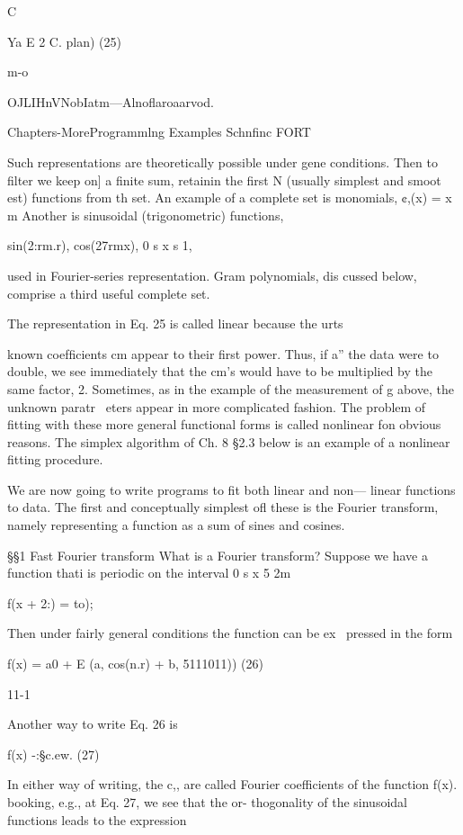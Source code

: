 {{{{{{{{C

Ya E 2 C. plan) (25)

m-o

OJLIHnVNobIatm—Alnoﬂaroaarvod.

Chapters-MoreProgrammlng Examples Schnﬁnc FORT

Such representations are theoretically possible under gene
conditions. Then to ﬁlter we keep on] a ﬁnite sum, retainin
the ﬁrst N (usually simplest and smoot est) functions from th
set. An example of a complete set is monomials, ¢,(x) = x m
Another is sinusoidal (trigonometric) functions,

sin(2:rm.r), cos(27rmx), 0 s x s 1,

used in Fourier-series representation. Gram polynomials, dis
cussed below, comprise a third useful complete set.

The representation in Eq. 25 is called linear because the urts

known coefﬁcients cm appear to their ﬁrst power. Thus, if a”
the data were to double, we see immediately that the cm's would
have to be multiplied by the same factor, 2. Sometimes, as in the
example of the measurement of g above, the unknown paratr~
eters appear in more complicated fashion. The problem of ﬁtting
with these more general functional forms is called nonlinear fon
obvious reasons. The simplex algorithm of Ch. 8 §2.3 below is an
example of a nonlinear ﬁtting procedure.

 

We are now going to write programs to ﬁt both linear and non—
linear functions to data. The ﬁrst and conceptually simplest oﬂ
these is the Fourier transform, namely representing a function as
a sum of sines and cosines.

§§1 Fast Fourier transform
What is a Fourier transform? Suppose we have a function thati
is periodic on the interval 0 s x 5 2m

f(x + 2:) = to);

Then under fairly general conditions the function can be ex~
pressed in the form

f(x) = a0 + E (a, cos(n.r) + b, 5111011)) (26)

11-1

Another way to write Eq. 26 is

f(x) -:§c.ew. (27)

In either way of writing, the c,, are called Fourier coefficients of
the function f(x). booking, e.g., at Eq. 27, we see that the or-
thogonality of the sinusoidal functions leads to the expression

}}}}}}}}
